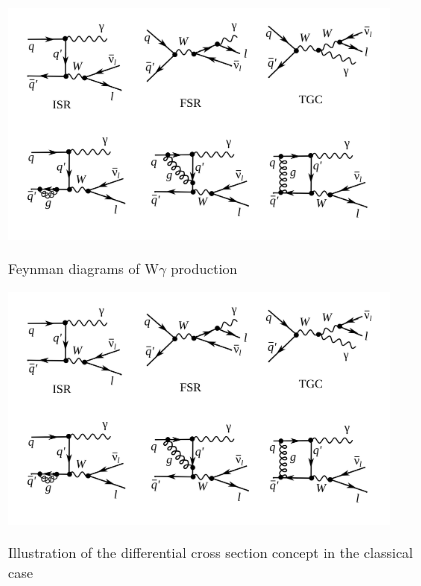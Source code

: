 \begin{figure}[htb]
  \begin{center}
    {\includegraphics[width=0.90\textwidth]{../figs/WgAbout/feynmWg_LO_NLO.png}}
    \caption{Feynman diagrams of W$\gamma$ production}
    \label{fig:feynmWg_LO_NLO}
  \end{center}
\end{figure}



\begin{figure}[htb]
  \begin{center}
    {\includegraphics[width=0.90\textwidth]{../figs/WgAbout/feynmWg_LO_NLO.png}}
    \caption{Illustration of the differential cross section concept in the classical case}
    \label{fig:CSclassical}
  \end{center}
\end{figure}

